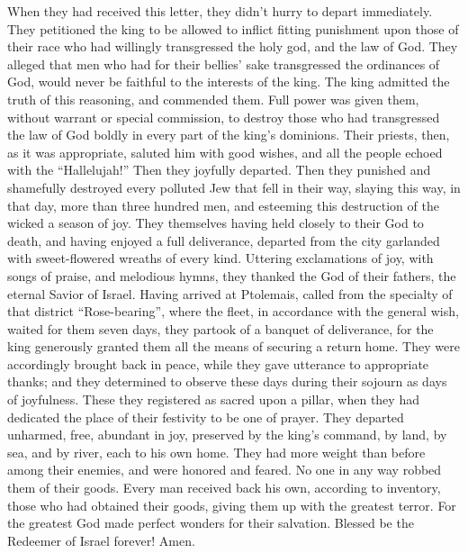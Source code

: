  When they had received this letter, they didn't hurry to
depart immediately. They petitioned the king to be allowed to inflict
fitting punishment upon those of their race who had willingly
transgressed the holy god, and the law of God.  They
alleged that men who had for their bellies' sake transgressed the
ordinances of God, would never be faithful to the interests of the king.
 The king admitted the truth of this reasoning, and
commended them. Full power was given them, without warrant or special
commission, to destroy those who had transgressed the law of God boldly
in every part of the king's dominions.  Their priests,
then, as it was appropriate, saluted him with good wishes, and all the
people echoed with the ``Hallelujah!'' Then they joyfully departed.
 Then they punished and shamefully destroyed every polluted
Jew that fell in their way,  slaying this way, in that day,
more than three hundred men, and esteeming this destruction of the
wicked a season of joy.  They themselves having held
closely to their God to death, and having enjoyed a full deliverance,
departed from the city garlanded with sweet-flowered wreaths of every
kind. Uttering exclamations of joy, with songs of praise, and melodious
hymns, they thanked the God of their fathers, the eternal Savior of
Israel.  Having arrived at Ptolemais, called from the
specialty of that district ``Rose-bearing'', where the fleet, in
accordance with the general wish, waited for them seven days,
 they partook of a banquet of deliverance, for the king
generously granted them all the means of securing a return home.
 They were accordingly brought back in peace, while they
gave utterance to appropriate thanks; and they determined to observe
these days during their sojourn as days of joyfulness. 
These they registered as sacred upon a pillar, when they had dedicated
the place of their festivity to be one of prayer. They departed
unharmed, free, abundant in joy, preserved by the king's command, by
land, by sea, and by river, each to his own home.  They had
more weight than before among their enemies, and were honored and
feared. No one in any way robbed them of their goods. 
Every man received back his own, according to inventory, those who had
obtained their goods, giving them up with the greatest terror. For the
greatest God made perfect wonders for their salvation. 
Blessed be the Redeemer of Israel forever! Amen.
